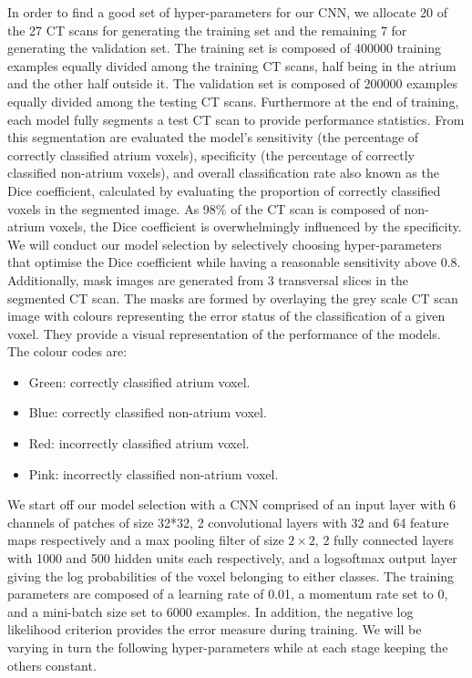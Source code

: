 \noindent In order to find a good set of hyper-parameters for our CNN, we allocate 20 of the 27 CT scans for generating the training set and the remaining 7 for generating the validation set. The training set is composed of 400000 training examples equally divided among the training CT scans, half being in the atrium and the other half outside it. The validation set is composed of 200000 examples equally divided among the testing CT scans. Furthermore at the end of training, each model fully segments a test CT scan to provide performance statistics. From this segmentation are evaluated the model's sensitivity (the percentage of correctly classified atrium voxels), specificity (the percentage of correctly classified non-atrium voxels), and overall classification rate also known as the Dice coefficient, calculated by evaluating the proportion of correctly classified voxels in the segmented image. As 98\% of the CT scan is composed of non-atrium voxels, the Dice coefficient is overwhelmingly influenced by the specificity. We will conduct our model selection by selectively choosing hyper-parameters that optimise the Dice coefficient while having a reasonable sensitivity above 0.8.\\

\noindent Additionally, mask images are generated from 3 transversal slices in the segmented CT scan. The masks are formed by overlaying the grey scale CT scan image with colours representing the error status of the classification of a given voxel. They provide a visual representation of the performance of the models. The colour codes are:

\begin{itemize}
	\item Green: correctly classified atrium voxel.
	\item Blue: correctly classified non-atrium voxel.
	\item Red: incorrectly classified atrium voxel.
	\item Pink: incorrectly classified non-atrium voxel.
\end{itemize}

\noindent We start off our model selection with a CNN comprised of an input layer with 6 channels of patches of size 32*32, 2 convolutional layers with 32 and 64 feature maps respectively and a max pooling filter of size $2 \times 2$, 2 fully connected layers with 1000 and 500 hidden units each respectively, and a logsoftmax output layer giving the log probabilities of the voxel belonging to either classes. The training parameters are composed of a learning rate of 0.01, a momentum rate set to 0, and a mini-batch size set to 6000 examples. In addition, the negative log likelihood criterion provides the error measure during training. We will be varying in turn the following hyper-parameters while at each stage keeping the others constant.\\

